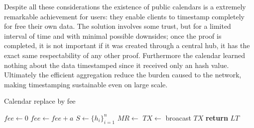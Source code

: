 Despite all these considerations the existence of public calendars is a extremely remarkable achievement for users: they enable clients to timestamp completely for free their own data. 
The solution involves some trust, but for a limited interval of time and with minimal possible downsides; once the proof is completed, it is not important if it was created through a central hub, it has the exact same respectability of any other proof. 
Furthermore the calendar learned nothing about the data timestamped since it received only an hash value. 
Ultimately the efficient aggregation reduce the burden caused to the network, making timestamping sustainable even on large scale.

\begin{algorithm}
	\caption{Calendar replace by fee}
	\label{alg:calendar-rbf}
	\begin{algorithmic}[1]
		\State $fee \gets 0$
		\Repeat 
		\State $fee \gets fee + a$
		\State $S \gets \{h_i\}_{i=1}^n$ 
		\State $MR \gets$ 
		\State $TX \gets$  
		\State broacast $TX$
		\State \textbf{return} $LT$ 
		\EndProcedure
	\end{algorithmic}
\end{algorithm}